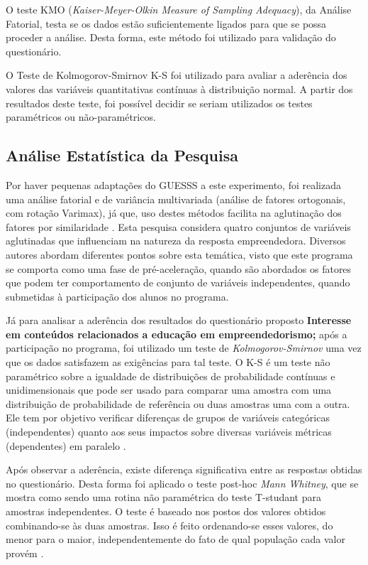 O teste KMO (\textit{Kaiser-Meyer-Olkin Measure of Sampling Adequacy}), da Análise Fatorial, testa se os dados estão suficientemente ligados para que se possa proceder a análise. Desta forma, este método foi utilizado para validação do questionário.

O Teste de Kolmogorov-Smirnov K-S foi utilizado para avaliar a aderência dos valores das variáveis quantitativas contínuas à distribuição normal. A partir dos resultados deste teste, foi possível decidir se seriam utilizados os testes paramétricos ou não-paramétricos.

\subsection{Análise Estatística da Pesquisa}

Por haver pequenas adaptações do GUESSS a este experimento, foi realizada uma análise fatorial e de variância multivariada (análise de fatores ortogonais, com rotação Varimax), já que, uso destes métodos facilita na aglutinação dos fatores por similaridade \cite{hair_multivariate_2006}. Esta pesquisa considera quatro conjuntos de variáveis aglutinadas que influenciam na natureza da resposta empreendedora. Diversos autores abordam diferentes pontos sobre esta temática, visto que este programa se comporta como uma fase de pré-aceleração, quando são abordados os fatores que podem ter comportamento de conjunto de variáveis independentes, quando submetidas à participação dos alunos no programa.

Já para analisar a aderência dos resultados do questionário proposto \textbf{Interesse em conteúdos relacionados a educação em empreendedorismo;} após a participação no programa, foi utilizado um teste de \textit{Kolmogorov-Smirnov} uma vez que os dados satisfazem as exigências para tal teste. O K-S é um teste não paramétrico sobre a igualdade de distribuições de probabilidade contínuas e unidimensionais que pode ser usado para comparar uma amostra com uma distribuição de probabilidade de referência ou duas amostras uma com a outra. Ele tem por objetivo verificar diferenças de grupos de variáveis categóricas (independentes) quanto aos seus impactos sobre diversas variáveis métricas (dependentes) em paralelo \cite{hair_alise_2009}. 

Após observar a aderência, existe diferença significativa entre as respostas obtidas no questionário. Desta forma foi aplicado o teste post-hoc \textit{Mann Whitney}, que se mostra como sendo uma rotina não paramétrica do teste T-studant para amostras independentes. O teste é baseado nos postos dos valores obtidos combinando-se às duas amostras. Isso é feito ordenando-se esses valores, do menor para o maior, independentemente do fato de qual população cada valor provém \cite{matsouaka_optimal_2018}.

